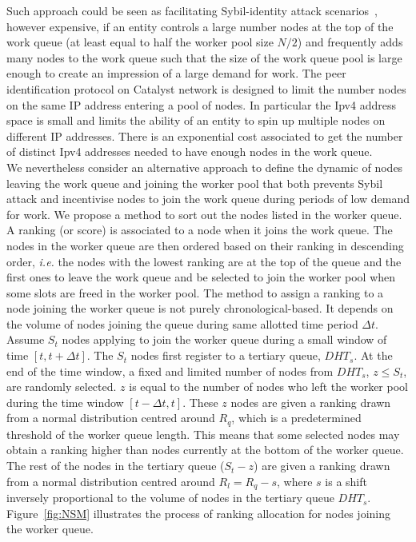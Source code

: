 Such approach could be seen as facilitating Sybil-identity attack scenarios~\cite{sybil}, however expensive, if an entity controls a large number nodes at the top of the work queue (at least equal to half the worker pool size $N/2$) and frequently adds many nodes to the work queue such that the size of the work queue pool is large enough to create an impression of a large demand for work. The peer identification protocol on Catalyst network is designed to limit the number nodes on the same IP address entering a pool of nodes. In particular the Ipv4 address space is small and limits the ability of an entity to spin up multiple nodes on different IP addresses. There is an exponential cost associated to get the number of distinct Ipv4 addresses needed to have enough nodes in the work queue. \\

We nevertheless consider an alternative approach to define the dynamic of nodes leaving the work queue and joining the worker pool that both prevents Sybil attack and incentivise nodes to join the work queue during periods of low demand for work. We propose a method to sort out the nodes listed in the worker queue. A ranking (or score) is associated to a node when it joins the work queue. The nodes in the worker queue are then ordered based on their ranking in descending order, \textit{i.e.} the nodes with the lowest ranking are at the top of the queue and the first ones to leave the work queue and be selected to join the worker pool when some slots are freed in the worker pool. The method to assign a ranking to a node joining the worker queue is not purely chronological-based. It depends on the volume of nodes joining the queue during same allotted time period $\Delta t$. Assume $S_t$ nodes applying to join the worker queue during a small window of time $[t, t+\Delta t]$. The $S_t$ nodes first register to a tertiary queue, $DHT_s$. At the end of the time window, a fixed and limited number of nodes from $DHT_s$, $z \leq S_t$, are randomly selected. $z$ is equal to the number of nodes who left the worker pool during the time window  $[t-\Delta t, t]$. These $z$ nodes are given a ranking drawn from a normal distribution centred around $R_q$, which is a predetermined threshold of the worker queue length. This means that some selected nodes may obtain a ranking higher than nodes currently at the bottom of the worker queue. The rest of the nodes in the tertiary queue ($S_t-z$) are given a ranking drawn from a normal distribution centred around $R_l = R_q - s$, where $s$ is a shift inversely proportional to the volume of nodes in the tertiary queue $DHT_s$. Figure~\ref{fig:NSM} illustrates the process of ranking allocation for nodes joining the worker queue. \\

